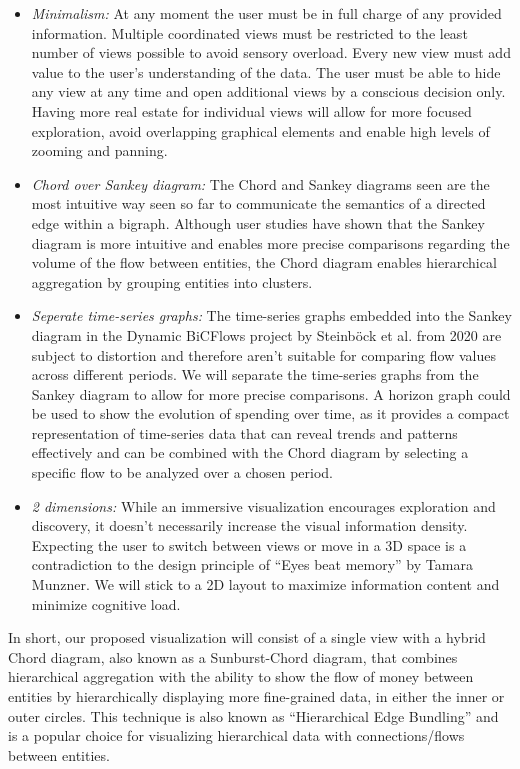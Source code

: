 \documentclass{vgtc}
\begin{document}
\begin{itemize}
    \item \textit{Minimalism:} At any moment the user must be in full charge of any provided information. Multiple coordinated views must be restricted to the least number of views possible to avoid sensory overload. Every new view must add value to the user's understanding of the data. The user must be able to hide any view at any time and open additional views by a conscious decision only. Having more real estate for individual views will allow for more focused exploration, avoid overlapping graphical elements and enable high levels of zooming and panning.

    \item \textit{Chord over Sankey diagram:} The Chord and Sankey diagrams seen are the most intuitive way seen so far to communicate the semantics of a directed edge within a bigraph. Although user studies \cite{10.1145/3544548.3581119} have shown that the Sankey diagram is more intuitive and enables more precise comparisons regarding the volume of the flow between entities, the Chord diagram enables hierarchical aggregation by grouping entities into clusters.

    \item \textit{Seperate time-series graphs:} The time-series graphs embedded into the Sankey diagram in the Dynamic BiCFlows project by Steinböck et al. from 2020 \cite{Waldner2020InteractiveEO} are subject to distortion and therefore aren't suitable for comparing flow values across different periods. We will separate the time-series graphs from the Sankey diagram to allow for more precise comparisons. A horizon graph could be used to show the evolution of spending over time, as it provides a compact representation of time-series data that can reveal trends and patterns effectively and can be combined with the Chord diagram by selecting a specific flow to be analyzed over a chosen period.

    \item \textit{2 dimensions:} While an immersive visualization encourages exploration and discovery, it doesn't necessarily increase the visual information density. Expecting the user to switch between views or move in a 3D space is a contradiction to the design principle of ``Eyes beat memory'' by Tamara Munzner. We will stick to a 2D layout to maximize information content and minimize cognitive load.
\end{itemize}

In short, our proposed visualization will consist of a single view with a hybrid Chord diagram, also known as a Sunburst-Chord diagram, that combines hierarchical aggregation with the ability to show the flow of money between entities by hierarchically displaying more fine-grained data, in either the inner or outer circles. This technique is also known as ``Hierarchical Edge Bundling'' and is a popular choice for visualizing hierarchical data with connections/flows between entities.
\end{document}
